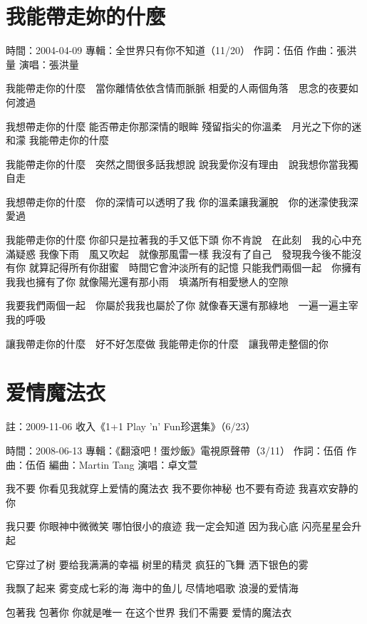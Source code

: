 \documentclass[UTF8,a4paper,oneside,twocolumn,12pt]{ctexbook}
\newcommand{\infopair}[2]{\textbullet #1：#2}
\newcommand{\zc}[1][伍佰]{\infopair{作詞}{#1}}
\newcommand{\zq}[1][伍佰]{\infopair{作曲}{#1}}
\newcommand{\bq}[1][伍佰]{\infopair{編曲}{#1}}
\newcommand{\zj}[1]{\infopair{專輯}{#1}}
\newcommand{\sj}[1]{\infopair{時間}{#1}}
\newenvironment{info}{\begin{flushleft}\kaishu
	}
	{\end{flushleft}\normalsize\yahei\par}
\newenvironment{lyric}{
	}
{}
\begin{document}
\section{我能帶走妳的什麼}
\begin{info}
	\sj{2004-04-09}
	\zj{全世界只有你不知道（11/20）}
	\zc[伍佰]
	\zq[張洪量]
	\infopair{演唱}{張洪量}
\end{info}
\begin{lyric}
	我能帶走你的什麼　當你離情依依含情而脈脈
	相愛的人兩個角落　思念的夜要如何渡過

	我想帶走你的什麼
	能否帶走你那深情的眼眸
	殘留指尖的你溫柔　月光之下你的迷和濛
	我能帶走你的什麼

	我能帶走你的什麼　突然之間很多話我想說
	說我愛你沒有理由　說我想你當我獨自走

	我想帶走你的什麼　你的深情可以透明了我
	你的溫柔讓我灑脫　你的迷濛使我深愛過

	我能帶走你的什麼
	你卻只是拉著我的手又低下頭
	你不肯說　在此刻　我的心中充滿疑惑
	我像下雨　風又吹起　就像那風雷一樣
	我沒有了自己　發現我今後不能沒有你
	就算記得所有你甜蜜　時間它會沖淡所有的記憶
	只能我們兩個一起　你擁有我我也擁有了你
	就像陽光還有那小雨　填滿所有相愛戀人的空隙

	我要我們兩個一起　你屬於我我也屬於了你
	就像春天還有那綠地　一遍一遍主宰我的呼吸

	讓我帶走你的什麼　好不好怎麼做
	我能帶走你的什麼　讓我帶走整個的你
\end{lyric}

\section{爱情魔法衣}
\begin{info}
	註：2009-11-06 收入《1+1 Play 'n' Fun珍選集》（6/23）

	\sj{2008-06-13}
	\zj{《翻滾吧！蛋炒飯》電視原聲帶（3/11）}
	\zc
	\zq
	\bq[Martin Tang]
	\infopair{演唱}{卓文萱}
\end{info}
\begin{lyric}
	我不要 你看见我就穿上爱情的魔法衣
	我不要你神秘 也不要有奇迹 我喜欢安静的你

	我只要 你眼神中微微笑 哪怕很小的痕迹
	我一定会知道 因为我心底 闪亮星星会升起

	它穿过了树 要给我满满的幸福
	树里的精灵 疯狂的飞舞 洒下银色的雾

	我飘了起来 雾变成七彩的海
	海中的鱼儿 尽情地唱歌 浪漫的爱情海

	包著我 包著你 你就是唯一
	在这个世界 我们不需要 爱情的魔法衣
\end{lyric}
\end{document}
